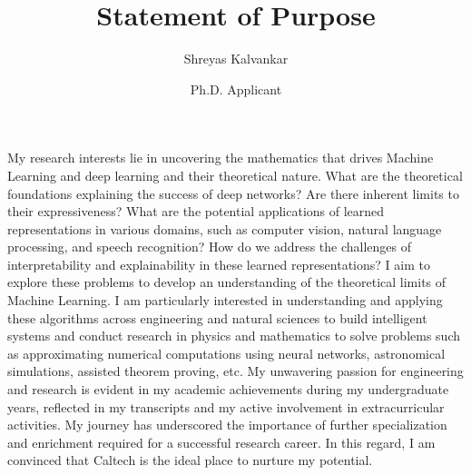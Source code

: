 \documentclass{article}
\title{Statement of Purpose}
\author{Shreyas Kalvankar}
\date{Ph.D. Applicant}
\begin{document}
  \maketitle%
  \thispagestyle{empty}
\vspace{5pt}
\hspace{0.25in}My research interests lie in uncovering the mathematics that
drives Machine Learning and deep learning and their theoretical nature. What are
the theoretical foundations explaining the success of deep networks? Are there
inherent limits to their expressiveness? What are the potential applications of
learned representations in various domains, such as computer vision, natural
language processing, and speech recognition? How do we address the challenges of
interpretability and explainability in these learned representations? I aim to
explore these problems to develop an understanding of the theoretical limits of
Machine Learning. I am particularly interested in understanding and applying
these algorithms across engineering and natural sciences to build intelligent
systems and conduct research in physics and mathematics to solve problems such
as approximating numerical computations using neural networks, astronomical
simulations, assisted theorem proving, etc. My unwavering passion for
engineering and research is evident in my academic achievements during my
undergraduate years, reflected in my transcripts and my active involvement in
extracurricular activities. My journey has underscored the importance of further
specialization and enrichment required for a successful research career. In this
regard, I am convinced that Caltech is the ideal place to nurture my
potential.\vspace{5pt}
\end{document}
